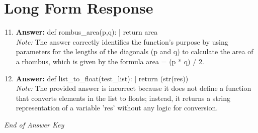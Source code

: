 \documentclass[12pt]{article}
\begin{document}
\section*{Long Form Response}
\begin{enumerate}[label=\arabic*.]
\setcounter{enumi}{10}
\item \textbf{Answer:} def rombus\_area(p,q): | return area
\\ \textit{Note:} The answer correctly identifies the function's purpose by using parameters for the lengths of the diagonals (p and q) to calculate the area of a rhombus, which is given by the formula area = (p * q) / 2.
\item \textbf{Answer:} def list\_to\_float(test\_list): | return (str(res))
\\ \textit{Note:} The provided answer is incorrect because it does not define a function that converts elements in the list to floats; instead, it returns a string representation of a variable 'res' without any logic for conversion.
\end{enumerate}

\vfill
\noindent\textit{End of Answer Key}
\end{document}
